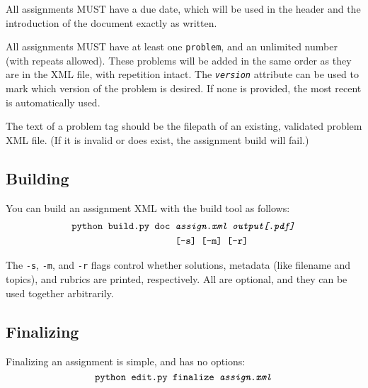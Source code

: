     All assignments MUST have a due date, which will be used in the header and the introduction of the document exactly as written. 
    
    All assignments MUST have at least one \texttt{problem}, and an unlimited number (with repeats allowed). These problems will be added in the same order as they are in the XML file, with repetition intact. The \texttt{\textit{version}} attribute can be used to mark which version of the problem is desired. If none is provided, the most recent is automatically used.
    
    The text of a problem tag should be the filepath of an existing, validated problem XML file. (If it is invalid or does exist, the assignment build will fail.)
    
  \subsection{Building}
    You can build an assignment XML with the build tool as follows: 
    \begin{align*}
      \texttt{python build.py }\texttt{doc }&\texttt{\textit{assign.xml output[.pdf]}}\\
      ~&\texttt{[-s] [-m] [-r]}
    \end{align*}
    
    The \texttt{-s}, \texttt{-m}, and \texttt{-r} flags control whether solutions, metadata (like filename and topics), and rubrics are printed, respectively. All are optional, and they can be used together arbitrarily.
    
  \subsection{Finalizing}
    Finalizing an assignment is simple, and has no options:
    \[\texttt{python edit.py }\texttt{finalize \textit{assign.xml}}\]